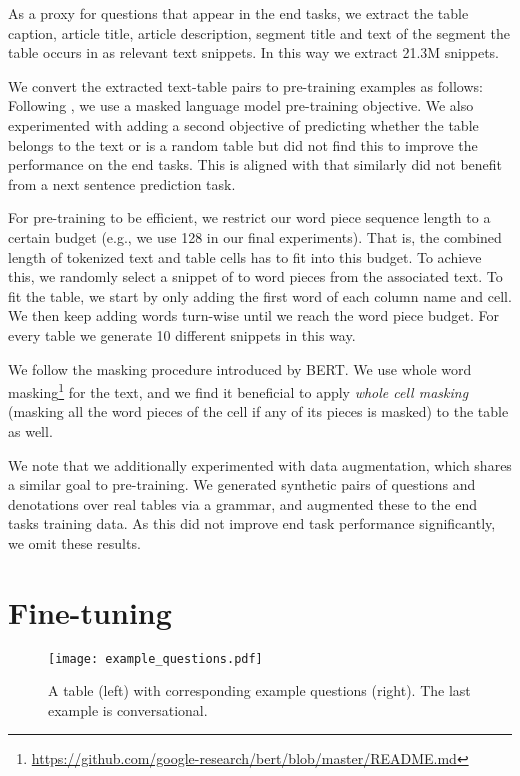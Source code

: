 \documentclass[11pt,a4paper]{article}
\begin{document}
As a proxy for questions that appear in the end tasks, we extract 
the table caption, article title, article description, segment title and text of the segment the table occurs in as relevant text snippets. In this way we extract 21.3M snippets.

We convert the extracted text-table pairs to pre-training examples as follows:
Following , we use a masked language model pre-training objective. 
We also experimented with adding a second objective of predicting whether the table belongs to the
text or is a random table but did not find this to improve the performance on the end tasks.
This is aligned with  that similarly did not benefit from a next sentence prediction task.

For pre-training to be efficient, we restrict our word piece sequence length to a certain budget (e.g., we use 128 in our final experiments). That is, the combined length of tokenized text and table cells has to fit into this budget. To achieve this, we randomly select a snippet of  to  word pieces from the associated text. To fit the table, we start by only adding the first word of each column name and cell. We then keep adding words turn-wise until we reach the word piece budget.
For every table we generate 10 different snippets in this way.

We follow the masking procedure introduced by BERT. We use whole word masking\footnote{\url{https://github.com/google-research/bert/blob/master/README.md}} for the text,
and we find it beneficial to apply \textit{whole cell masking} (masking all the word pieces of the cell if any of its pieces is masked) to the table as well.

We note that we additionally experimented with data augmentation, which shares a similar goal to pre-training. We generated synthetic pairs of questions and denotations over real tables via a grammar, and augmented these to the end tasks training data. As this did not improve end task performance significantly, we omit these results.
 \section{Fine-tuning}
\label{sec:fine_tuning}

\begin{figure*}[t]
\centering
\texttt{[image: example\_questions.pdf]}
\caption{A table (left) with corresponding example questions (right). The last example is conversational.}
\label{fig:dataset_examples}
\end{figure*}
\end{document}
